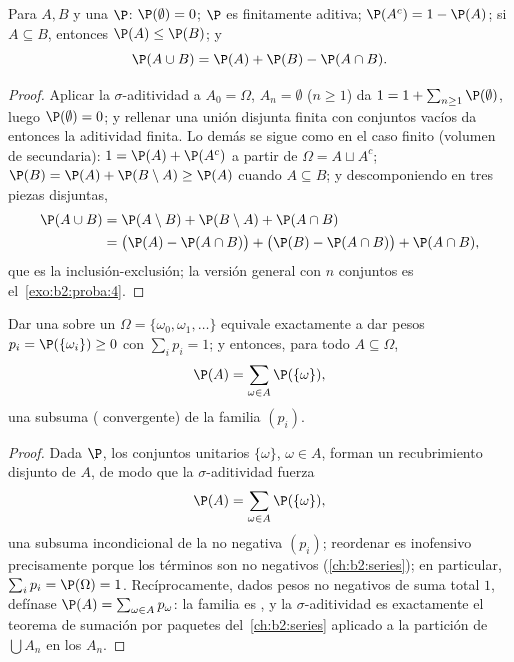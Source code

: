 \begin{proposition}\label{prop:b2:proba:rules}
Para  $A, B$ y una  $\P$:
$\P(\emptyset) = 0$; $\P$ es finitamente aditiva; $\P(A^c) = 1 -
\P(A)$; si $A \subseteq B$, entonces $\P(A) \leq \P(B)$; y
\[
\P(A \cup B) = \P(A) + \P(B) - \P(A \cap B) .
\]
\end{proposition}

\begin{proof}
Aplicar la $\sigma$-aditividad a $A_0 = \Omega$, $A_n = \emptyset$
($n \geq 1$) da $1 = 1 + \sum_{n\geq1}\P(\emptyset)$, luego
$\P(\emptyset) = 0$; y rellenar una unión disjunta finita con
conjuntos vacíos da entonces la aditividad finita. Lo demás se sigue
como en el caso finito (volumen de secundaria): $1 = \P(A) + \P(A^c)$
a partir de $\Omega = A \sqcup A^c$; $\P(B) = \P(A) + \P(B \setminus
A) \geq \P(A)$ cuando $A \subseteq B$; y descomponiendo en tres
piezas disjuntas,
\begin{align*}
\P(A \cup B) &= \P(A \setminus B) + \P(B \setminus A) +
\P(A \cap B)\\
&= \bigl(\P(A) - \P(A\cap B)\bigr) + \bigl(\P(B) - \P(A\cap
B)\bigr) + \P(A \cap B),
\end{align*}
que es la inclusión-exclusión; la versión general con $n$ conjuntos
es el~\cref{exo:b2:proba:4}.
\end{proof}

\begin{proposition}\label{prop:b2:proba:distribution}
Dar una  sobre un $\Omega = \{\omega_0,
\omega_1, \dots\}$  equivale exactamente a dar pesos $p_i
= \P(\{\omega_i\}) \geq 0$ con $\sum_i p_i = 1$; y entonces, para
todo $A \subseteq \Omega$,
\[
\P(A) = \sum_{\omega \in A} \P(\{\omega\}) ,
\]
una subsuma ( convergente) de la familia $(p_i)$.
\end{proposition}

\begin{proof}
Dada $\P$, los conjuntos unitarios $\{\omega\}$, $\omega \in A$,
forman un recubrimiento disjunto  de $A$, de modo que la
$\sigma$-aditividad fuerza
\[
\P(A) = \sum_{\omega\in A}\P(\{\omega\}),
\]
una subsuma incondicional de la  no negativa $(p_i)$;
reordenar es inofensivo precisamente porque los términos son no
negativos (\cref{ch:b2:series}); en particular, $\sum_ip_i =
\P(\Omega) = 1$. Recíprocamente, dados pesos no negativos de suma
total $1$, defínase $\P(A) = \sum_{\omega \in A}p_\omega$: la familia
es , y la $\sigma$-aditividad es exactamente el teorema de
sumación por paquetes del~\cref{ch:b2:series} aplicado a la partición
de $\bigcup A_n$ en los $A_n$.
\end{proof}

